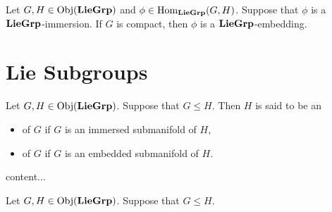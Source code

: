 \documentclass{book}
\begin{document}
\begin{ex}
	Let $G, H \in \operatorname{Obj}(\operatorname*{\text{\textbf{LieGrp}}})$ and $\phi \in \operatorname{Hom}_{\operatorname*{\text{\textbf{LieGrp}}}}(G, H)$. Suppose that $\phi$ is a $\operatorname*{\text{\textbf{LieGrp}}}$-immersion. If $G$ is compact, then $\phi$ is a $\operatorname*{\text{\textbf{LieGrp}}}$-embedding.
\end{ex}
































\newpage
\section{Lie Subgroups}

\begin{defn}
	Let $G, H \in \operatorname{Obj}(\operatorname*{\text{\textbf{LieGrp}}})$. Suppose that $G \leqslant H$. Then $H$ is said to be an
	\begin{itemize}
		\item {} of $G$ if $G$ is an immersed submanifold of $H$,
		\item {} of $G$ if $G$ is an embedded submanifold of $H$.
	\end{itemize}
\end{defn}

\begin{defn}
	content...
\end{defn}


\begin{ex}
	Let $G, H \in \operatorname{Obj}(\operatorname*{\text{\textbf{LieGrp}}})$. Suppose that $G \leqslant H$. 
\end{ex}
\end{document}
